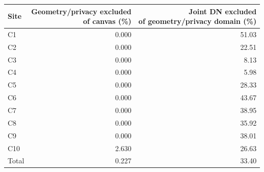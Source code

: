 \begin{tabular*}{\textwidth}{@{\extracolsep{\fill}}lrr@{}}
\toprule
Site & \shortstack{Geometry/privacy excluded\\of canvas (\%)} & \shortstack{Joint DN excluded\\of geometry/privacy domain (\%)} \\
\midrule
C1 & 0.000 & 51.03 \\
C2 & 0.000 & 22.51 \\
C3 & 0.000 & 8.13 \\
C4 & 0.000 & 5.98 \\
C5 & 0.000 & 28.33 \\
C6 & 0.000 & 43.67 \\
C7 & 0.000 & 38.95 \\
C8 & 0.000 & 35.92 \\
C9 & 0.000 & 38.01 \\
C10 & 2.630 & 26.63 \\
\midrule
Total & 0.227 & 33.40 \\
\bottomrule
\end{tabular*}
